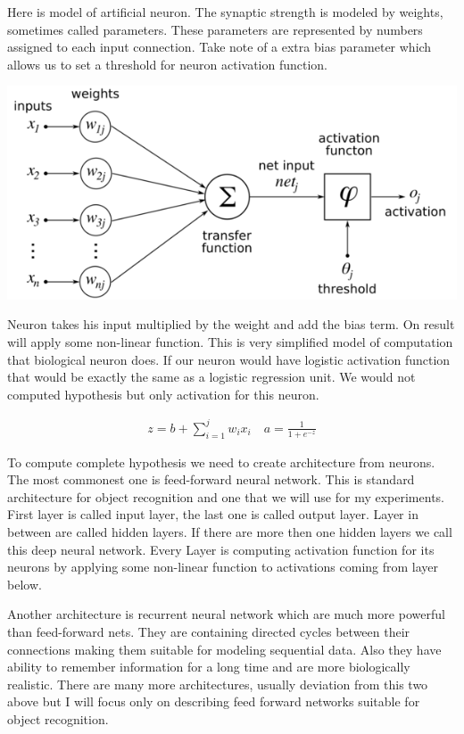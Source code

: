 Here is model of artificial neuron. The synaptic strength is modeled by weights, sometimes called parameters. These parameters are represented by numbers assigned to each input connection. Take note of a extra bias parameter which allows us to set a threshold for neuron activation function.

\begin{center}
\includegraphics[scale=0.3]{./pictures/3.png}
\end{center}

Neuron takes his input multiplied by the weight and add the bias term. On result will apply some non-linear function. This is very simplified model of computation that biological neuron does. If our neuron would have logistic activation function that would be exactly the same as a logistic regression unit. We would not computed hypothesis but only activation for this neuron. 

\begin{eqnarray}
z = b + \sum\limits_{i=1}^j w_i x_i \quad
a = \frac{1}{1 + e^{-z}}
\end{eqnarray}

To compute complete hypothesis we need to create architecture from neurons. The most commonest one is feed-forward neural network. This is standard architecture for object recognition and one that we will use for my experiments. First layer is called input layer, the last one is called output layer. Layer in between are called hidden layers. If there are more then one hidden layers we call this deep neural network. Every Layer is computing activation function for its neurons by applying some non-linear function to activations coming from layer below.

Another architecture is recurrent neural network which are much more powerful than feed-forward nets. They are containing directed cycles between their connections making them suitable for modeling sequential data. Also they have ability to remember information for a long time and are more biologically realistic. There are many more architectures, usually deviation from this two above but I will focus only on describing feed forward networks suitable for object recognition.

